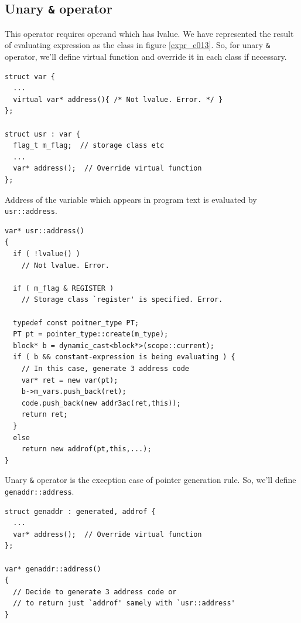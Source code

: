 \subsection{Unary {\tt{\&}} operator}
\label{expr_e019}

This operator requires operand which has lvalue.
We have represented the result of evaluating expression
as the class in figure \ref{expr_e013}.
So, for unary {\tt{\&}} operator,
we'll define virtual function and override it in each class
if necessary.
\begin{verbatim}
struct var {
  ...
  virtual var* address(){ /* Not lvalue. Error. */ }
};

struct usr : var {
  flag_t m_flag;  // storage class etc
  ...
  var* address();  // Override virtual function
};
\end{verbatim}
Address of the variable which appears in program text
is evaluated by {\tt{usr::address}}.
\begin{verbatim}
var* usr::address()
{
  if ( !lvalue() )
    // Not lvalue. Error.

  if ( m_flag & REGISTER )
    // Storage class `register' is specified. Error.

  typedef const poitner_type PT;
  PT pt = pointer_type::create(m_type);
  block* b = dynamic_cast<block*>(scope::current);
  if ( b && constant-expression is being evaluating ) {
    // In this case, generate 3 address code
    var* ret = new var(pt);
    b->m_vars.push_back(ret);
    code.push_back(new addr3ac(ret,this));
    return ret;
  }
  else
    return new addrof(pt,this,...);
}
\end{verbatim}
Unary {\tt{\&}} operator is the exception case of pointer generation
rule. So, we'll define {\tt{genaddr::address}}.
\begin{verbatim}
struct genaddr : generated, addrof {
  ...
  var* address();  // Override virtual function
};

var* genaddr::address()
{
  // Decide to generate 3 address code or
  // to return just `addrof' samely with `usr::address'
}
\end{verbatim}

